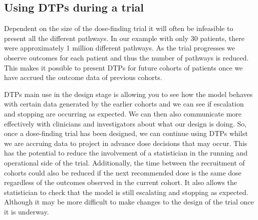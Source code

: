 \subsection{Using DTPs during a trial}

Dependent on the size of the dose-finding trial it will often be infeasible to present all the different pathways. In our example with only 30 patients, there were approximately 1 million different pathways. As the trial progresses we observe outcomes for each patient and thus the number of pathways is reduced. This makes it possible to present DTPs for future cohorts of patients once we have accrued the outcome data of previous cohorts. 

DTPs main use in the design stage is allowing you to see how the model behaves with certain data generated by the earlier cohorts and we can see if escalation and stopping are occurring as expected. We can then also communicate more effectively with clinicians and investigators about what our design is doing. So, once a dose-finding trial has been designed, we can continue using DTPs whilst we are accruing data to project in advance dose decisions that may occur. This has the potential to reduce the involvement of a statistician in the running and operational side of the trial. Additionally, the time between the recruitment of cohorts could also be reduced if the next recommended dose is the same dose regardless of the outcomes observed in the current cohort. It also allows the statistician to check that the model is still escalating and stopping as expected. Although it may be more difficult to make changes to the design of the trial once it is underway. 

